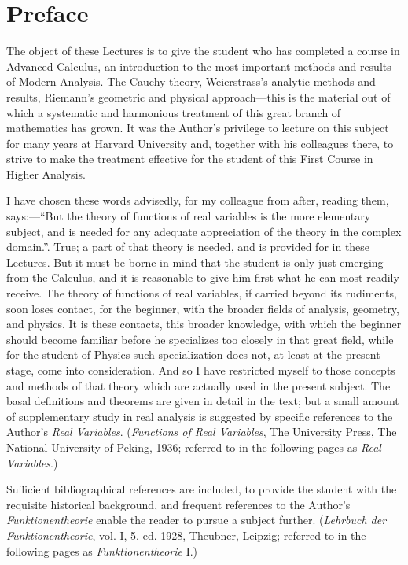 \chapter*{Preface}

The object of these Lectures is to give the student who has completed a course in Advanced Calculus, an introduction to the most important methods and results of Modern Analysis. The Cauchy theory, Weierstrass's analytic methods and results, Riemann's geometric and physical approach---this is the material out of which a systematic and harmonious treatment of this great branch of mathematics has grown. It was the Author's privilege to lecture on this subject for many years at Harvard University and, together with his colleagues there, to strive to make the treatment effective for the student of this First Course in Higher Analysis. 

I have chosen these words advisedly, for my colleague from after, reading them, says:---``But the theory of functions of real variables is the more elementary subject, and is needed for any adequate appreciation of the theory in the complex domain.''. True; a part of that theory is needed, and is provided for in these Lectures. But it must be borne in mind that the student is only just emerging from the Calculus, and it is reasonable to give him first what he can most readily receive. The theory of functions of real variables, if carried beyond its rudiments, soon loses contact, for the beginner, with the broader fields of analysis, geometry, and physics. It is these contacts, this broader knowledge, with which the beginner should become familiar before he specializes too closely in that great field, while for the student of Physics such specialization does not, at least at the present stage, come into consideration. And so I have restricted myself to those concepts and methods of that theory which are actually used in the present subject. The basal definitions and theorems are given in detail in the text; but a small amount of supplementary study in real analysis is suggested by specific references to the Author's \emph{Real Variables}. (\emph{Functions of Real Variables}, The University Press, The National University of Peking, 1936; referred to in the following pages as \emph{Real Variables}.)

Sufficient bibliographical references are included, to provide the student with the requisite historical background, and frequent references to the Author's \emph{Funktionentheorie} enable the reader to pursue a subject further. (\emph{Lehrbuch der Funktionentheorie}, vol. I, 5. ed. 1928, Theubner, Leipzig; referred to in the following pages as \emph{Funktionentheorie} I.)

